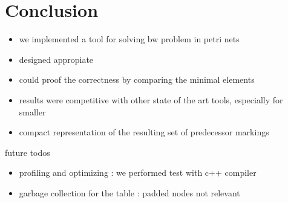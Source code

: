 \chapter{Conclusion}\label{chapter:conclusion}


\begin{itemize}
\item we implemented a tool for solving bw problem in petri nets 
\item designed appropiate 
\item could proof the correctness by comparing the minimal elements
\item results were competitive with other state of the art tools, especially for smaller 
\item compact representation of the resulting set of predecessor markings 
\end{itemize}



future todos 
\begin{itemize}
\item profiling and optimizing : we performed test with c++ compiler
\item garbage collection for the table : padded nodes not relevant
\end{itemize}